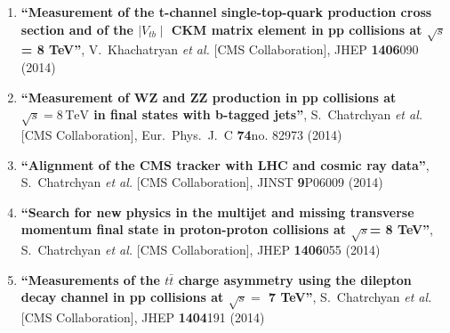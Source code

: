 \begin{enumerate}
\item%
{\bf ``Measurement of the t-channel single-top-quark production cross section and of the $\mid V_{tb} \mid$ CKM matrix element in pp collisions at $\sqrt{s}$= 8 TeV''}, 
  V.~Khachatryan {\it et al.}  [CMS Collaboration], 
JHEP {\bf 1406}090 (2014) %


\item%
{\bf ``Measurement of WZ and ZZ production in pp collisions at $\sqrt{s} = 8\,\text {TeV} $ in final states with b-tagged jets''}, 
  S.~Chatrchyan {\it et al.}  [CMS Collaboration], 
Eur.\ Phys.\ J.\ C {\bf 74}no. 82973 (2014) %


\item%
{\bf ``Alignment of the CMS tracker with LHC and cosmic ray data''}, 
  S.~Chatrchyan {\it et al.}  [CMS Collaboration], 
JINST {\bf 9}P06009 (2014) %


\item%
{\bf ``Search for new physics in the multijet and missing transverse momentum final state in proton-proton collisions at $\sqrt{s}$= 8 TeV''}, 
  S.~Chatrchyan {\it et al.}  [CMS Collaboration], 
JHEP {\bf 1406}055 (2014) %


\item%
{\bf ``Measurements of the $t\bar{t}$ charge asymmetry using the dilepton decay channel in pp collisions at $\sqrt{s} =$ 7 TeV''}, 
  S.~Chatrchyan {\it et al.}  [CMS Collaboration], 
JHEP {\bf 1404}191 (2014) %



\end{enumerate}
